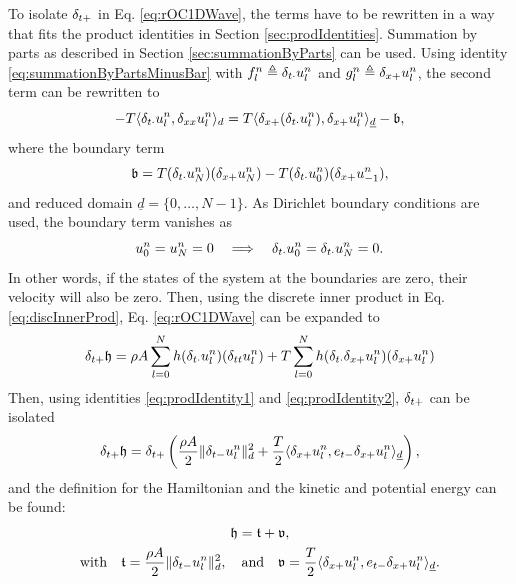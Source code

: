 {{To isolate $\delta_{t+}$ in Eq. \eqref{eq:rOC1DWave}, the terms have to be rewritten in a way that fits the product identities in Section \ref{sec:prodIdentities}.
Summation by parts as described in Section \ref{sec:summationByParts}  can be used. Using identity \eqref{eq:summationByPartsMinusBar}  with $f_l^n \triangleq \delta_{t\cdot} u_l^n$ and $g_l^n \triangleq \delta_{x+} u_l^n$, the second term can be rewritten to 
%
\begin{equation*}
    - T \langle \delta_{t\cdot}u_l^n, \delta_{xx} u_l^n\rangle_d  = T\langle \delta_{x+}(\delta_{t\cdot}u_l^n), \delta_{x+}u_l^n\rangle_{\underline{d}} - \mathfrak{b},
\end{equation*}
where the boundary term
\begin{equation*}
    \mathfrak{b} = T(\delta_{t\cdot} u_N^n)(\delta_{x+} u_N^n) - T(\delta_{t\cdot} u_0^n) (\delta_{x+} u_{-1}^n),
\end{equation*}
and reduced domain $\underline{d} = \{0, \hdots, N-1\}$. As Dirichlet boundary conditions are used, the boundary term vanishes as 
\begin{equation*}
    u_0^n = u_N^n = 0 \quad \Longrightarrow \quad \delta_{t\cdot} u_0^n = \delta_{t\cdot} u_N^n = 0.
\end{equation*}
In other words, if the states of the system at the boundaries are zero, their velocity will also be zero. 
Then, using the discrete inner product in Eq. \eqref{eq:discInnerProd}, Eq. \eqref{eq:rOC1DWave} can be expanded to
\begin{equation}
    \delta_{t+} \mathfrak{h} = \rho A \sum_{l = 0}^N h(\delta_{t\cdot} u_l^n)(\delta_{tt} u_l^n) + T \sum_{l = 0}^N h(\delta_{t\cdot} \delta_{x+} u_l^n)(\delta_{x+} u_l^n)
\end{equation}
Then, using identities \eqref{eq:prodIdentity1} and \eqref{eq:prodIdentity2}, $\delta_{t+}$ can be isolated 
\begin{equation}
    \delta_{t+} \mathfrak{h} = \delta_{t+} \left(\frac{\rho A}{2}\lVert\delta_{t-} u_l^n\rVert^2_d + \frac{T}{2}\langle\delta_{x+}u_l^n, e_{t-}\delta_{x+}u_l^n\rangle_{\underline{d}}\right),
\end{equation}
and the definition for the Hamiltonian and the kinetic and potential energy can be found:
\begin{equation}\label{eq:energyBalance1DWave}
    \begin{gathered}
        \mathfrak{h} = \mathfrak{t} + \mathfrak{v},\\
        \text{with}\quad \mathfrak{t} = \frac{\rho A}{2}\lVert\delta_{t-} u_l^n\rVert^2_d, \quad \text{and} \quad \mathfrak{v} = \frac{T}{2}\langle\delta_{x+}u_l^n, e_{t-}\delta_{x+}u_l^n\rangle_{\underline{d}}.
    \end{gathered}
\end{equation}

}}
